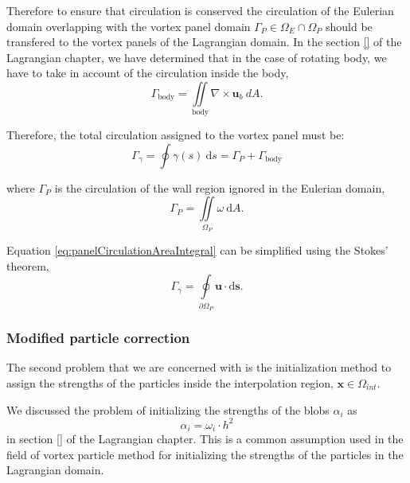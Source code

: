 Therefore to ensure that circulation is conserved the circulation of the Eulerian domain overlapping with the vortex panel domain $\Gamma_P \in \Omega_E \cap \Omega_P$ should be transfered to the vortex panels of the Lagrangian domain. In the section \ref{} of the Lagrangian chapter, we have determined that in the case of rotating body, we have to take in account of the circulation inside the body,
	\begin{equation}
	\Gamma_{\mathrm{body}} = \iint\limits_{\mathrm{body}} \nabla \times \mathbf{u}_b \ d A.
	\end{equation}

Therefore, the total circulation assigned to the vortex panel must be:
\begin{equation}
\Gamma_{\gamma} = \oint \gamma(s) \ \mathrm{d}s = \Gamma_P + \Gamma_{\mathrm{body}}
\label{eq:panelCirculationAreaIntegral}
\end{equation}

where $\Gamma_P$ is the circulation of the wall region ignored in the Eulerian domain,
\begin{equation}
\Gamma_P = \iint\limits_{\Omega_P} \omega \ \mathrm{d}A.
\end{equation} 

Equation \ref{eq:panelCirculationAreaIntegral} can be simplified using the Stokes' theorem,
\begin{equation}
\Gamma_{\gamma} = \oint\limits_{\partial \Omega_P} \mathbf{u}\cdot\mathrm{d}\mathbf{s}.
\end{equation}

\subsubsection*{Modified particle correction}

The second problem that we are concerned with is the initialization method to assign the strengths of the particles inside the interpolation region, $\mathbf{x} \in \Omega_{int}$. 

We discussed the problem of initializing the strengths of the blobs $\alpha_i$ as
\begin{equation}
\alpha_i = \omega_i \cdot h^2
\end{equation}
in section \ref{} of the Lagrangian chapter. This is a common assumption used in the field of vortex particle method for initializing the strengths of the particles in the Lagrangian domain. 




